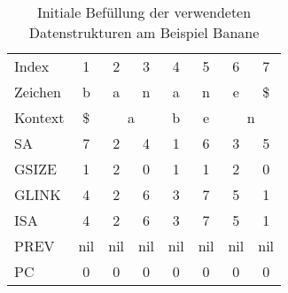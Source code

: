\begin{table}[H]
\begin{tabular}{l|ccccccc}
Index   & 1                       & 2   & 3                      & 4                      & 5                      & 6          & 7         \\
Zeichen & b                       & a   & n                      & a                      & n                      & e          & \$        \\
Kontext & \multicolumn{1}{c|}{\$} & \multicolumn{2}{c|}{a}       & \multicolumn{1}{c|}{b} & \multicolumn{1}{c|}{e} & \multicolumn{2}{c}{n} \\
SA      & \multicolumn{1}{c|}{7}  & 2   & \multicolumn{1}{c|}{4} & \multicolumn{1}{c|}{1} & \multicolumn{1}{c|}{6} & 3          & 5         \\
GSIZE   & \multicolumn{1}{c|}{1}  & 2   & \multicolumn{1}{c|}{0} & \multicolumn{1}{c|}{1} & \multicolumn{1}{c|}{1} & 2          & 0         \\
GLINK   & 4                       & 2   & 6                      & 3                      & 7                      & 5          & 1         \\
ISA     & 4                       & 2   & 6                      & 3                      & 7                      & 5          & 1         \\
PREV    & nil                     & nil & nil                    & nil                    & nil                    & nil        & nil       \\
PC      & 0                       & 0   & 0                      & 0                      & 0                      & 0          & 0        
\end{tabular}

\caption[Initiale Befüllung der verwendeten Datenstrukturen am Beispiel Banane]{Initiale Befüllung der verwendeten Datenstrukturen am Beispiel Banane}
\label{fig_datastructures}
\end{table}